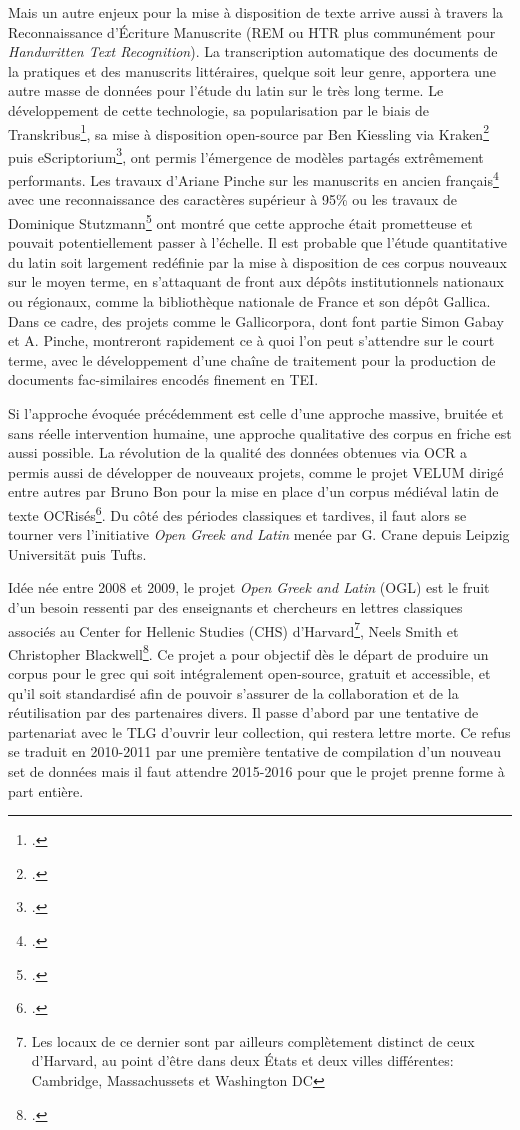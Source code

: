 Mais un autre enjeux pour la mise à disposition de texte arrive aussi à travers la Reconnaissance d'Écriture Manuscrite (REM ou HTR plus communément pour \textit{Handwritten Text Recognition}). La transcription automatique des documents de la pratiques et des manuscrits littéraires, quelque soit leur genre, apportera une autre masse de données pour l'étude du latin sur le très long terme. Le développement de cette technologie, sa popularisation par le biais de Transkribus\footcite{kahle2017transkribus}, sa mise à disposition open-source par Ben Kiessling via Kraken\footcite{kiessling2019kraken} puis eScriptorium\footcite{kiessling_escripto}, ont permis l'émergence de modèles partagés extrêmement performants. Les travaux d'Ariane Pinche sur les manuscrits en ancien français\footcite{Pinche_CREMMA_Medieval_an_2021} avec une reconnaissance des caractères supérieur à 95\% ou les travaux de Dominique Stutzmann\footcite{hazem2020books} ont montré que cette approche était prometteuse et pouvait potentiellement passer à l'échelle. Il est probable que l'étude quantitative du latin soit largement redéfinie par la mise à disposition de ces corpus nouveaux sur le moyen terme, en s'attaquant de front aux dépôts institutionnels nationaux ou régionaux, comme la bibliothèque nationale de France et son dépôt Gallica. Dans ce cadre, des projets comme le Gallicorpora, dont font partie Simon Gabay et A. Pinche, montreront rapidement ce à quoi l'on peut s'attendre sur le court terme, avec le développement d'une chaîne de traitement pour la production de documents fac-similaires encodés finement en TEI.

Si l'approche évoquée précédemment est celle d'une approche massive, bruitée et sans réelle intervention humaine, une approche qualitative des corpus en friche est aussi possible. La révolution de la qualité des données obtenues via OCR a permis aussi de développer de nouveaux projets, comme le projet VELUM dirigé entre autres par Bruno Bon pour la mise en place d'un corpus médiéval latin de texte OCRisés\footcite{bon2019challenges}. Du côté des périodes classiques et tardives, il faut alors se tourner vers l'initiative \textit{Open Greek and Latin} menée par G. Crane depuis Leipzig Universität puis Tufts.

Idée née entre 2008 et 2009, le projet \textit{Open Greek and Latin} (OGL) est le fruit d'un besoin ressenti par des enseignants et chercheurs en lettres classiques associés au Center for Hellenic Studies (CHS) d'Harvard\footnote{Les locaux de ce dernier sont par ailleurs complètement distinct de ceux d'Harvard, au point d'être dans deux États et deux villes différentes: Cambridge, Massachussets et Washington DC}, Neels Smith et Christopher Blackwell\footcite{muellner2019free}. Ce projet a pour objectif dès le départ de produire un corpus pour le grec qui soit intégralement open-source, gratuit et accessible, et qu'il soit standardisé afin de pouvoir s'assurer de la collaboration et de la réutilisation par des partenaires divers. Il passe d'abord par une tentative de partenariat avec le TLG d'ouvrir leur collection, qui restera lettre morte. Ce refus se traduit en 2010-2011 par une première tentative de compilation d'un nouveau set de données mais il faut attendre 2015-2016 pour que le projet prenne forme à part entière.

